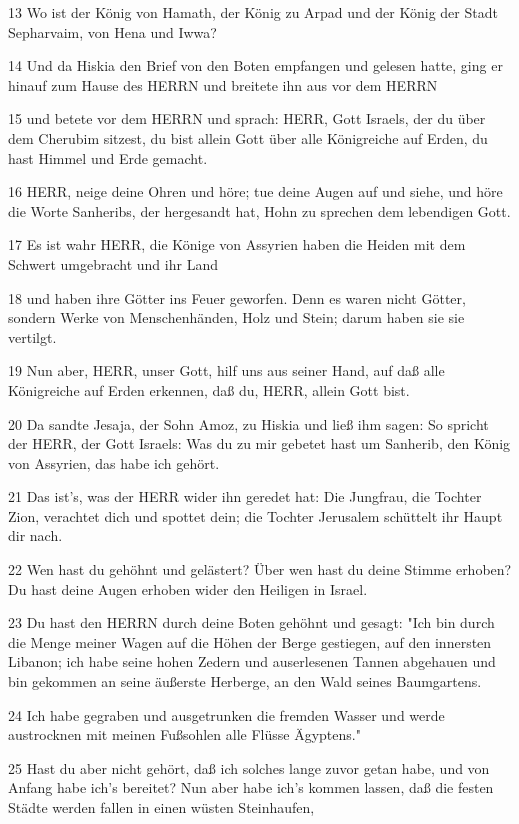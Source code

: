 \par 13 Wo ist der König von Hamath, der König zu Arpad und der König der Stadt Sepharvaim, von Hena und Iwwa?
\par 14 Und da Hiskia den Brief von den Boten empfangen und gelesen hatte, ging er hinauf zum Hause des HERRN und breitete ihn aus vor dem HERRN
\par 15 und betete vor dem HERRN und sprach: HERR, Gott Israels, der du über dem Cherubim sitzest, du bist allein Gott über alle Königreiche auf Erden, du hast Himmel und Erde gemacht.
\par 16 HERR, neige deine Ohren und höre; tue deine Augen auf und siehe, und höre die Worte Sanheribs, der hergesandt hat, Hohn zu sprechen dem lebendigen Gott.
\par 17 Es ist wahr HERR, die Könige von Assyrien haben die Heiden mit dem Schwert umgebracht und ihr Land
\par 18 und haben ihre Götter ins Feuer geworfen. Denn es waren nicht Götter, sondern Werke von Menschenhänden, Holz und Stein; darum haben sie sie vertilgt.
\par 19 Nun aber, HERR, unser Gott, hilf uns aus seiner Hand, auf daß alle Königreiche auf Erden erkennen, daß du, HERR, allein Gott bist.
\par 20 Da sandte Jesaja, der Sohn Amoz, zu Hiskia und ließ ihm sagen: So spricht der HERR, der Gott Israels: Was du zu mir gebetet hast um Sanherib, den König von Assyrien, das habe ich gehört.
\par 21 Das ist's, was der HERR wider ihn geredet hat: Die Jungfrau, die Tochter Zion, verachtet dich und spottet dein; die Tochter Jerusalem schüttelt ihr Haupt dir nach.
\par 22 Wen hast du gehöhnt und gelästert? Über wen hast du deine Stimme erhoben? Du hast deine Augen erhoben wider den Heiligen in Israel.
\par 23 Du hast den HERRN durch deine Boten gehöhnt und gesagt: "Ich bin durch die Menge meiner Wagen auf die Höhen der Berge gestiegen, auf den innersten Libanon; ich habe seine hohen Zedern und auserlesenen Tannen abgehauen und bin gekommen an seine äußerste Herberge, an den Wald seines Baumgartens.
\par 24 Ich habe gegraben und ausgetrunken die fremden Wasser und werde austrocknen mit meinen Fußsohlen alle Flüsse Ägyptens."
\par 25 Hast du aber nicht gehört, daß ich solches lange zuvor getan habe, und von Anfang habe ich's bereitet? Nun aber habe ich's kommen lassen, daß die festen Städte werden fallen in einen wüsten Steinhaufen,
